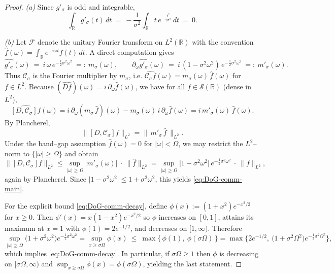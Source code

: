 \documentclass[10pt]{article}
\theoremstyle{definition}
\theoremstyle{plain}
\begin{document}
\begin{proof}
\emph{(a)} Since $g'_\sigma$ is odd and integrable,
\[
\int_{\mathbb R} g'_\sigma(t)\,dt\ =\ -\frac1{\sigma^2}\int_{\mathbb R} t\,e^{-\frac{t^2}{2\sigma^2}}\,dt\ =\ 0.
\]

\smallskip
\emph{(b)} Let $\mathcal F$ denote the unitary Fourier transform on $L^2(\mathbb R)$ with the convention $\widehat f(\omega)=\int_{\mathbb R}e^{-i\omega t}f(t)\,dt$. A direct computation gives
\[
\widehat{g'_\sigma}(\omega)\ =\ i\,\omega\,e^{-\frac12\sigma^2\omega^2}\ =:\ m_\sigma(\omega),\qquad \partial_\omega \widehat{g'_\sigma}(\omega)\ =\ i\,(1-\sigma^2\omega^2)\,e^{-\frac12\sigma^2\omega^2}\ =:\ m'_\sigma(\omega).
\]
Thus $\mathcal C_\sigma$ is the Fourier multiplier by $m_\sigma$, i.e.
$\widehat{\mathcal C_\sigma f}(\omega)=m_\sigma(\omega)\,\widehat f(\omega)$ for $f\in L^2$.
Because $(\widehat{Df})(\omega)=i\,\partial_\omega\widehat f(\omega)$, we have for all $f\in \mathcal S(\mathbb R)$ (dense in $L^2$),
\[
\widehat{[D,\mathcal C_\sigma]f}(\omega)
= i\,\partial_\omega(m_\sigma\,\widehat f)(\omega)-m_\sigma(\omega)\,i\,\partial_\omega \widehat f(\omega)
= i\,m'_\sigma(\omega)\,\widehat f(\omega).
\]
By Plancherel,
\[
\|[D,\mathcal C_\sigma]f\|_{L^2}=\|\,m'_\sigma\,\widehat f\,\|_{L^2}.
\]
Under the band–gap assumption $\widehat f(\omega)=0$ for $|\omega|<\Omega$, we may restrict the $L^2$–norm to $\{|\omega|\ge \Omega\}$ and obtain
\[
\|[D,\mathcal C_\sigma]f\|_{L^2}
\le \sup_{|\omega|\ge \Omega} |m'_\sigma(\omega)|\ \cdot\ \|\widehat f\|_{L^2}
= \sup_{|\omega|\ge \Omega} \big|1-\sigma^2\omega^2\big|\,e^{-\frac12\sigma^2\omega^2}\ \cdot\ \|f\|_{L^2},
\]
again by Plancherel. Since $\big|1-\sigma^2\omega^2\big|\le 1+\sigma^2\omega^2$, this yields \eqref{eq:DoG-comm-main}.

For the explicit bound \eqref{eq:DoG-comm-decay}, define $\phi(x):=(1+x^2)e^{-x^2/2}$ for $x\ge 0$.
Then $\phi'(x)=x(1-x^2)e^{-x^2/2}$ so $\phi$ increases on $[0,1]$, attains its maximum at $x=1$ with $\phi(1)=2e^{-1/2}$, and decreases on $[1,\infty)$. Therefore
\[
\sup_{|\omega|\ge \Omega} \big(1+\sigma^2\omega^2\big)e^{-\frac12\sigma^2\omega^2}
=\sup_{x\ge \sigma\Omega}\phi(x)\ \le\ \max\!\big\{\,\phi(1),\ \phi(\sigma\Omega)\,\big\}
=\max\!\Big\{2e^{-1/2},\ \big(1+\sigma^2\Omega^2\big)e^{-\frac12\sigma^2\Omega^2}\Big\},
\]
which implies \eqref{eq:DoG-comm-decay}. In particular, if $\sigma\Omega\ge 1$ then $\phi$ is decreasing on $[\sigma\Omega,\infty)$ and
$\sup_{x\ge \sigma\Omega}\phi(x)=\phi(\sigma\Omega)$, yielding the last statement.
\end{proof}
\end{document}
